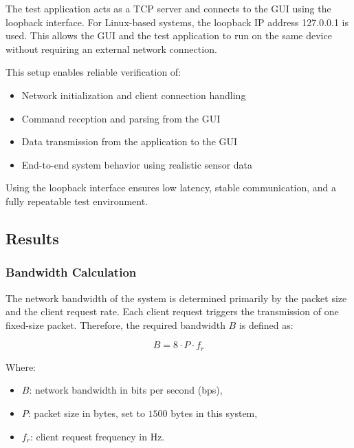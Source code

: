 \documentclass{article}
\begin{document}
The test application acts as a TCP server and connects to the GUI using the 
loopback interface. For Linux-based systems, the loopback IP address 127.0.0.1 is 
used. This allows the GUI and the test application to run on the same device 
without requiring an external network connection.

This setup enables reliable verification of:

\begin{itemize}
    \item Network initialization and client connection handling
    \item Command reception and parsing from the GUI
    \item Data transmission from the application to the GUI
    \item End-to-end system behavior using realistic sensor data 
\end{itemize}



Using the loopback interface ensures low latency, stable communication, and a fully repeatable test environment.




\newpage
\subsection{Results}

\subsubsection{Bandwidth Calculation}

The network bandwidth of the system is determined primarily by the packet size and the client request rate. Each client request triggers the transmission of one fixed-size packet. Therefore, the required bandwidth $B$ is defined as:

\begin{equation}
B = 8 \cdot P \cdot f_r
\end{equation}


Where:
\begin{itemize}
    \item[] $B$: network bandwidth in bits per second (bps),
    \item[] $P$: packet size in bytes, set to $1500$ bytes in this system,
    \item[] $f_r$: client request frequency in Hz.
\end{itemize}
\end{document}
